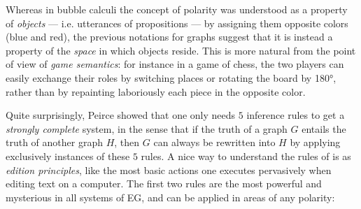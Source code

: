 \begin{remark}
  Whereas in bubble calculi the concept of polarity was understood as a property
  of \emph{objects} --- i.e. utterances of propositions --- by assigning them
  opposite colors (blue and red), the previous notations for graphs suggest that
  it is instead a property of the \emph{space} in which objects reside. This is
  more natural from the point of view of \emph{game semantics}: for instance in
  a game of chess, the two players can easily exchange their roles by switching
  places or rotating the board by 180°, rather than by repainting laboriously
  each piece in the opposite color.
\end{remark}

Quite surprisingly, Peirce showed that one only needs $5$ inference rules to get
a \emph{strongly complete} system, in the sense that if the truth of a graph $G$
entails the truth of another graph $H$, then $G$ can always be rewritten into
$H$ by applying exclusively instances of these $5$ rules. A nice way to understand the rules of  is as \emph{edition
principles}, like the most basic actions one executes pervasively when editing
text on a computer. The first two rules are the
most powerful and mysterious in all systems of EG, and can be applied in areas
of any polarity:
